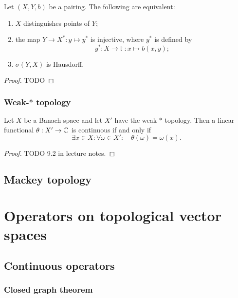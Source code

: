 \begin{proposition}
Let $(X,Y,b)$ be a pairing. The following are equivalent:
\begin{enumerate}
\item $X$ distinguishes points of $Y$;
\item the map $Y\to X^*: y\mapsto y^*$ is injective, where $y^*$ is defined by
\[ y^*: X\to \mathbb{F}: x\mapsto b(x,y); \]
\item $\sigma(Y,X)$ is Hausdorff.
\end{enumerate}
\end{proposition}
\begin{proof}
TODO
\end{proof}

\subsubsection{Weak-$*$ topology}

\begin{proposition} \label{weak*continuousFunctional}
Let $X$ be a Banach space and let $X'$ have the weak-$*$ topology. Then a linear functional $\theta: X'\to \mathbb{C}$ is continuous \textup{if and only if}
\[ \exists x\in X: \forall \omega\in X': \quad \theta(\omega) = \omega(x). \]
\end{proposition}
\begin{proof}
TODO 9.2 in lecture notes.
\end{proof}

\subsection{Mackey topology}

\begin{theorem}
\end{theorem}

\section{Operators on topological vector spaces}

\subsection{Continuous operators}
\subsubsection{Closed graph theorem}

